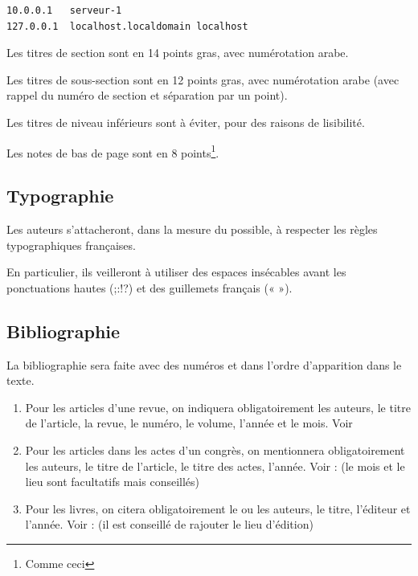 \documentclass[11pt]{jres}
\begin{document}
\begin{lstlisting}
10.0.0.1   serveur-1
127.0.0.1  localhost.localdomain localhost
\end{lstlisting}

Les titres de section sont en 14 points gras, avec numérotation arabe.

Les titres de sous-section sont en 12 points gras, avec numérotation arabe (avec rappel du numéro de section et séparation par un point).

Les titres de niveau inférieurs sont à éviter, pour des raisons de lisibilité.

Les notes de bas de page sont en 8 points\footnote{Comme ceci}. 

\subsection{Typographie}

Les auteurs s'attacheront, dans la mesure du possible, à respecter les
règles typographiques françaises.

En particulier, ils veilleront à utiliser des espaces insécables avant
les ponctuations hautes (;:!?) et des guillemets français (« »).

\subsection{Bibliographie}

La bibliographie sera faite avec des numéros et dans l'ordre d'apparition dans le texte.

\begin{enumerate}

\item Pour les articles d'une revue, on indiquera obligatoirement les
  auteurs, le titre de l'article, la revue, le numéro, le volume,
  l'année et le mois. Voir \cite{exemple1}

\item Pour les articles dans les actes d'un congrès, on mentionnera
  obligatoirement les auteurs, le titre de l'article, le titre des
  actes, l'année. Voir : \cite{exemple2} (le mois et le lieu sont
  facultatifs mais conseillés)

\item Pour les livres, on citera obligatoirement le ou les auteurs, le
  titre, l'éditeur et l'année. Voir : \cite{exemple3} (il est conseillé de
  rajouter le lieu d'édition)

\end{enumerate}
\end{document}
